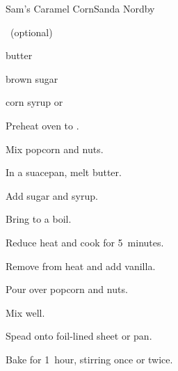 \begin{recipe}{Sam's Caramel Corn}{Sanda Nordby}{}

\begin{ingredients}
\item {} 
\item {} ~(optional)
\item \C{\half} butter
\item {} brown sugar
\item \C{\quarter} corn syrup or 
\item {}
\end{ingredients}

\begin{directions}
\item Preheat oven to .
\item Mix popcorn and nuts.
\item In a suacepan, melt butter.
\item Add sugar and syrup.
\item Bring to a boil.
\item Reduce heat and cook for 5~minutes.
\item Remove from heat and add vanilla.
\item Pour over popcorn and nuts.
\item Mix well.
\item Spead onto foil-lined sheet or pan.
\item Bake for 1~hour, stirring once or twice.
\end{directions}

\end{recipe}

